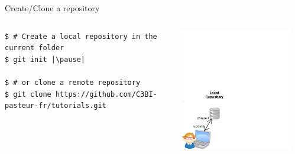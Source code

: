 \graphicspath{{images/}}




\begin{frame}[fragile]{Create/Clone a repository}
	\begin{columns}
		\begin{column}{0.6\textwidth}
			\begin{lstlisting}
$ # Create a local repository in the current folder
$ git init |\pause|

$ # or clone a remote repository
$ git clone https://github.com/C3BI-pasteur-fr/tutorials.git
			\end{lstlisting}
		\end{column}
		\begin{column}{0.4\textwidth}
			\begin{center}
				 {
					\includegraphics[width=0.9\textwidth]{init.png}
				}\only<2> {
}
\end{center}
\end{column}
\end{columns}
\end{frame}
